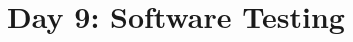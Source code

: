 \documentclass{article}
\begin{document}
\title{Day 9: Software Testing}
\author{}
\date{}
\maketitle


\end{document}
